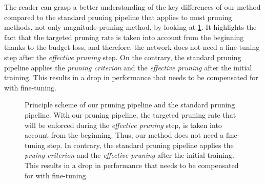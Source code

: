 The reader can grasp a better understanding of the key differences of our method
compared to the standard pruning pipeline that applies to most pruning methods,
not only magnitude pruning method, by looking at
\cref{fig:chap1:pruning_pipeline_comparison}. It highlights the fact that the
targeted pruning rate is taken into account from the beginning thanks to the
budget loss, and therefore, the network does not need a fine-tuning step after
the \emph{effective pruning} step. On the contrary, the standard pruning
pipeline applies the \emph{pruning criterion} and the \emph{effective pruning}
after the initial training. This results in a drop in performance that needs to
be compensated for with fine-tuning. \\

\begin{figure}
\centering
{}
  \caption{ Principle scheme of our pruning pipeline and the standard
  pruning pipeline. With our pruning pipeline, the targeted pruning rate that will
  be enforced during the \emph{effective pruning} step, is taken into account
  from the beginning. Thus, our method does not need a fine-tuning step. In
  contrary, the standard pruning pipeline applies the \emph{pruing criterion}
  and the \emph{effective pruning} after the initial training. This results in a
  drop in performance that needs to be compensated for with fine-tuning.}
  \label{fig:chap1:pruning_pipeline_comparison}
\end{figure}

